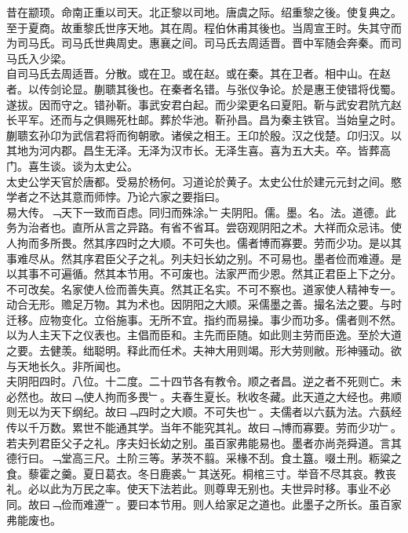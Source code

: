 \documentclass{zhvt-classic}
\begin{document}

\hspace*{2em}昔在颛顼。命南正重以司天。北正黎以司地。唐虞之际。绍重黎之後。使复典之。至于夏商。故重黎氏世序天地。其在周。程伯休甫其後也。当周宣王时。失其守而为司马氏。司马氏世典周史。惠襄之间。司马氏去周适晋。晋中军随会奔秦。而司马氏入少梁。\\
\hspace*{2em}自司马氏去周适晋。分散。或在卫。或在赵。或在秦。其在卫者。相中山。在赵者。以传剑论显。蒯聩其後也。在秦者名错。与张仪争论。於是惠王使错将伐蜀。遂拔。因而守之。错孙靳。事武安君白起。而少梁更名曰夏阳。靳与武安君阬亢赵长平军。还而与之俱赐死杜邮。葬於华池。靳孙昌。昌为秦主铁官。当始皇之时。蒯聩玄孙卬为武信君将而徇朝歌。诸侯之相王。王卬於殷。汉之伐楚。卬归汉。以其地为河内郡。昌生无泽。无泽为汉巿长。无泽生喜。喜为五大夫。卒。皆葬高门。喜生谈。谈为太史公。\\
\hspace*{2em}太史公学天官於唐都。受易於杨何。习道论於黄子。太史公仕於建元元封之间。愍学者之不达其意而师悖。乃论六家之要指曰。\\
\hspace*{2em}易大传。﹁天下一致而百虑。同归而殊涂。﹂夫阴阳。儒。墨。名。法。道德。此务为治者也。直所从言之异路。有省不省耳。尝窃观阴阳之术。大祥而众忌讳。使人拘而多所畏。然其序四时之大顺。不可失也。儒者博而寡要。劳而少功。是以其事难尽从。然其序君臣父子之礼。列夫妇长幼之别。不可易也。墨者俭而难遵。是以其事不可遍循。然其本节用。不可废也。法家严而少恩。然其正君臣上下之分。不可改矣。名家使人俭而善失真。然其正名实。不可不察也。道家使人精神专一。动合无形。赡足万物。其为术也。因阴阳之大顺。采儒墨之善。撮名法之要。与时迁移。应物变化。立俗施事。无所不宜。指约而易操。事少而功多。儒者则不然。以为人主天下之仪表也。主倡而臣和。主先而臣随。如此则主劳而臣逸。至於大道之要。去健羡。绌聪明。释此而任术。夫神大用则竭。形大劳则敝。形神骚动。欲与天地长久。非所闻也。\\
\hspace*{2em}夫阴阳四时。八位。十二度。二十四节各有教令。顺之者昌。逆之者不死则亡。未必然也。故曰﹁使人拘而多畏﹂。夫春生夏长。秋收冬藏。此天道之大经也。弗顺则无以为天下纲纪。故曰﹁四时之大顺。不可失也﹂。夫儒者以六蓺为法。六蓺经传以千万数。累世不能通其学。当年不能究其礼。故曰﹁博而寡要。劳而少功﹂。若夫列君臣父子之礼。序夫妇长幼之别。虽百家弗能易也。墨者亦尚尧舜道。言其德行曰。﹁堂高三尺。土阶三等。茅茨不翦。采椽不刮。食土簋。啜土刑。粝粱之食。藜霍之羹。夏日葛衣。冬日鹿裘。﹂其送死。桐棺三寸。举音不尽其哀。教丧礼。必以此为万民之率。使天下法若此。则尊卑无别也。夫世异时移。事业不必同。故曰﹁俭而难遵﹂。要曰本节用。则人给家足之道也。此墨子之所长。虽百家弗能废也。\\
\end{document}
